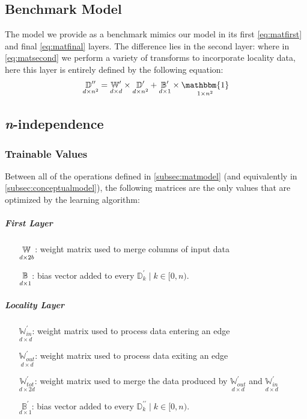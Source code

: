 \subsection{Benchmark Model}
\label{subsec:benchmark}
The model we provide as a benchmark mimics our model in its first 
\eqref{eq:matfirst} and final \eqref{eq:matfinal} layers. The difference lies in 
the second layer: where in \eqref{eq:matsecond} we perform a variety of 
transforms to incorporate locality data, here this layer is entirely defined by 
the following equation:
\begin{equation}
	\label{eq:benchsecond}
	\underset{d \times n^2}{\mathbb{D}^{\prime\prime}} = \underset{d \times 
	d}{\mathbb{W}^\prime} \times \underset{d \times n^2}{\mathbb{D}^\prime} + 
	\underset{d \times 1}{\mathbb{B}^\prime} \times \underset{1 \times 
	n^2}{\mathbbm{1}}
\end{equation}

\subsection{\textit{n}-independence}
\label{subsec:nindependence}
\subsubsection{Trainable Values}
Between all of the operations defined in \ref{subsec:matmodel} (and equivalently 
in \ref{subsec:conceptualmodel}), the following matrices are the only values 
that are optimized by the learning algorithm:
\subparagraph{First Layer}
\begin{itemize}
	\item[$\ubb{W}{d}{2b}$:] weight matrix used to merge columns of input data
	\item[$\ubb{B}{d}{1}$:] bias vector added to every $\mathbb{D}^\prime_k \mid 
		k \in [0,n)$.
\end{itemize}

\subparagraph{Locality Layer}
\begin{itemize}
	\item[$\underset{d \times d}{\mathbb{W}_{in}^\prime}$:] weight matrix used 
		to process data entering an edge
	\item[$\underset{d \times d}{\mathbb{W}_{out}^\prime}$:] weight matrix used 
		to process data exiting an edge
	\item[$\underset{d \times 2d}{\mathbb{W}_{tot}^\prime}$:] weight matrix used 
		to merge the data produced by $\underset{d \times 
			d}{\mathbb{W}_{out}^\prime}$ and $\underset{d \times
			d}{\mathbb{W}_{in}^\prime}$
	\item[$\underset{d \times 1}{\mathbb{B}^\prime}$:] bias vector added to 
		every $\mathbb{D}^{\prime\prime}_k \mid k \in [0,n)$.
\end{itemize}

